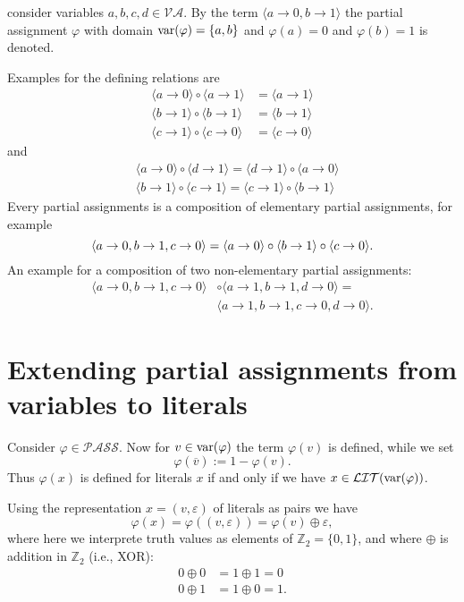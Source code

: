 \documentclass{article}
\def\mva{{\mathcal{VA}}}
\def\mpass{{\mathcal{PASS}}}
\def\mlit{{\mathcal{LIT}}}
\def\var{{\rm var}}
\begin{document}
consider variables $a,b,c,d \in \mva$. By the term $\langle a\to 0, b\to 1 \rangle$ the partial assignment $\varphi$ with domain $\var(\varphi) = \{a, b\}$ and $\varphi(a) = 0$ and $\varphi(b) = 1$ is denoted.

Examples for the defining relations are
\begin{align*}
\langle a\to 0 \rangle \circ \langle a\to 1 \rangle & = \langle a\to 1 \rangle \\
\langle b\to 1 \rangle \circ \langle b\to 1 \rangle & = \langle b\to 1 \rangle \\
\langle c\to 1 \rangle \circ \langle c\to 0 \rangle & = \langle c\to 0 \rangle
\end{align*}
and
\begin{align*}
& \langle a\to 0 \rangle \circ \langle d\to 1 \rangle = \langle d\to 1 \rangle \circ \langle a\to 0 \rangle \\
& \langle b\to 1 \rangle \circ \langle c\to 1 \rangle = \langle c\to 1 \rangle \circ \langle b\to 1 \rangle
\end{align*}
Every partial assignments is a composition of elementary partial assignments, for example
\[
\langle a\to 0, b\to 1, c\to 0 \rangle = \langle a\to 0 \rangle \circ \langle b\to 1 \rangle \circ \langle c\to 0 \rangle. \\
\]
An example for a composition of two non-elementary partial assignments:
\begin{align*}
\langle a\to 0, b\to 1, c\to 0 \rangle & \circ \langle a\to 1, b\to 1, d\to 0 \rangle = \\
& \langle a\to 1, b\to 1, c\to 0, d\to 0 \rangle.
\end{align*}

\section{Extending partial assignments from variables to literals}

Consider $\varphi \in \mpass$. Now for $v\in \var(\varphi)$ the term $\varphi(v)$ is defined, while we set
\[
\varphi(\overline{v}):= 1- \varphi(v).
\]
Thus $\varphi(x)$ is defined for literals $x$ if and only if we have $x\in \mlit (\var(\varphi))$.

Using the representation $x = (v, \varepsilon)$ of literals as pairs we have
\[
\varphi(x) = \varphi((v,\varepsilon)) = \varphi(v) \oplus \varepsilon,
\]
where here we interprete truth values as elements of $\mathbb{Z}_2 = \{0, 1\}$, and where $\oplus$ is addition in $\mathbb{Z}_2$ (i.e., XOR):
\begin{align*}
0 \oplus 0 & = 1 \oplus 1 = 0 \\
0 \oplus 1 & = 1 \oplus 0 = 1.
\end{align*}
\end{document}
